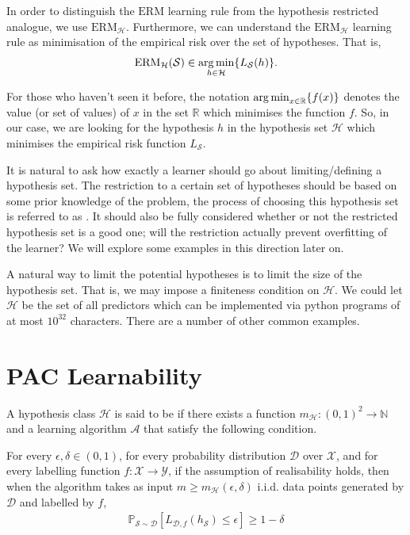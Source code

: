 In order to distinguish the $ \mathrm{ERM} $ learning rule from the hypothesis restricted analogue, we use $ \mathrm{ERM}_{\mathcal{H}} $. Furthermore, we can understand the $ \mathrm{ERM}_{\mathcal{H}} $ learning rule as minimisation of the empirical risk over the set of hypotheses. That is,
\begin{align*}
	\mathrm{ERM}_{\mathcal{H}}( \mathcal{S} ) \in \operatorname*{arg\,min}_{h \in \mathcal{H}}\{ L_{\mathcal{S}}( h ) \}.
\end{align*}

\begin{notation}
	For those who haven't seen it before, the notation $ \operatorname*{arg\,min}_{x \in \mathbb{R}}\{ f ( x ) \} $ denotes the value (or set of values) of $ x $ in the set $ \mathbb{R} $ which minimises the function $ f $. So, in our case, we are looking for the hypothesis $ h $ in the hypothesis set $ \mathcal{H} $ which minimises the empirical risk function $ L_{\mathcal{S}} $.
\end{notation}

It is natural to ask how exactly a learner should go about limiting/defining a hypothesis set. The restriction to a certain set of hypotheses should be based on some prior knowledge of the problem, the process of choosing this hypothesis set is referred to as . It should also be fully considered whether or not the restricted hypothesis set is a good one; will the restriction actually prevent overfitting of the learner? We will explore some examples in this direction later on.

\begin{example}
	A natural way to limit the potential hypotheses is to limit the size of the hypothesis set. That is, we may impose a finiteness condition on $ \mathcal{H} $. We could let $ \mathcal{H} $ be the set of all predictors which can be implemented via python programs of at most $ 10^{32} $ characters. There are a number of other common examples.
\end{example}

\section{PAC Learnability \challenging}
\begin{definition}
	A hypothesis class $ \mathcal{H} $ is said to be  if there exists a function $ m_{\mathcal{H}}: ( 0,1 )^{2}\to \mathbb{N} $ and a learning algorithm $ \mathcal{A} $ that satisfy the following condition.

	For every $ \epsilon, \delta \in ( 0,1 ) $, for every probability distribution $ \mathcal{D} $ over $ \mathcal{X} $, and for every labelling function $ f: \mathcal{X}\to \mathcal{Y} $, if the assumption of realisability holds, then when the algorithm takes as input $ m \geq m_{\mathcal{H}}( \epsilon, \delta ) $ i.i.d. data points generated by $ \mathcal{D} $ and labelled by $ f $,
	\begin{align*}
		\mathbb{P}_{\mathcal{S}\sim \mathcal{D}}\left[ L_{\mathcal{D}, f}( h_{\mathcal{S}} )\leq \epsilon \right] \geq 1-\delta
	\end{align*}
\end{definition}

